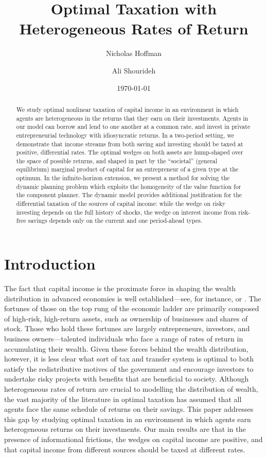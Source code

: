 \documentclass[11pt]{article}
\title{Optimal Taxation with Heterogeneous Rates of Return}
\author{
    Nicholas Hoffman\\
    \and 
    Ali Shourideh\\
}
\date{\today}
\begin{document}
\maketitle

\begin{abstract}
    We study optimal nonlinear taxation of capital income in an environment in which agents are heterogeneous in the returns that they earn on their investments. Agents in our model can borrow and lend to one another at a common rate, and invest in private entrepreneurial technology with idiosyncratic returns. In a two-period setting, we demonstrate that income streams from both saving and investing should be taxed at positive, differential rates. The optimal wedges on both assets are hump-shaped over the space of possible returns, and shaped in part by the ``societal'' (general equilibrium) marginal product of capital for an entrepreneur of a given type at the optimum. In the infinite-horizon extension, we present a method for solving the dynamic planning problem which exploits the homogeneity of the value function for the component planner. The dynamic model provides additional justification for the differential taxation of the sources of capital income: while the wedge on risky investing depends on the full history of shocks, the wedge on interest income from risk-free savings depends only on the current and one period-ahead types. 
\end{abstract}

\section{Introduction} \label{sec:intro}

The fact that capital income is the proximate force in shaping the wealth distribution in advanced economies is well established---see, for instance, \cite{benhabib2011distribution} or \cite{benhabib2019wealth}. The fortunes of those on the top rung of the economic ladder are primarily composed of high-risk, high-return assets, such as ownership of businesses and shares of stock. Those who hold these fortunes are largely entrepreneurs, investors, and business owners---talented individuals who face a range of rates of return in accumulating their wealth. Given these forces behind the wealth distribution, however, it is less clear what sort of tax and transfer system is optimal to both satisfy the redistributive motives of the government and encourage investors to undertake risky projects with benefits that are beneficial to society. Although heterogeneous rates of return are crucial to modelling the distribution of wealth, the vast majority of the literature in optimal taxation has assumed that all agents face the same schedule of returns on their savings. This paper addresses this gap by studying optimal taxation in an environment in which agents earn heterogeneous returns on their investments. Our main results are that in the presence of informational frictions, the wedges on capital income are positive, and that capital income from different sources should be taxed at different rates. 
\end{document}
